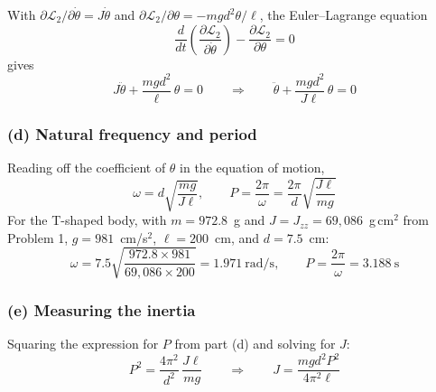 \documentclass[11pt,letterpaper]{article}
\begin{document}
With $\partial\mathcal{L}_2/\partial\dot\theta = J\dot\theta$ and $\partial\mathcal{L}_2/\partial\theta = -mgd^2\theta/\ell$, the Euler--Lagrange equation
\[
\frac{d}{dt}\left(\frac{\partial\mathcal{L}_2}{\partial\dot\theta}\right) - \frac{\partial\mathcal{L}_2}{\partial\theta} = 0
\]
gives
\[
J\ddot\theta + \frac{mgd^2}{\ell}\,\theta = 0
\qquad\Longrightarrow\qquad
\boxed{\ddot\theta + \frac{mgd^2}{J\ell}\,\theta = 0}
\]

\subsubsection*{(d) Natural frequency and period}

Reading off the coefficient of $\theta$ in the equation of motion,
\[
\boxed{\omega = d\sqrt{\frac{mg}{J\ell}}},
\qquad
\boxed{P = \frac{2\pi}{\omega} = \frac{2\pi}{d}\sqrt{\frac{J\ell}{mg}}}
\]
For the T-shaped body, with $m = 972.8$~g and $J = J_{zz} = 69{,}086$~g\,cm$^2$ from Problem 1, $g = 981$~cm/s$^2$, $\ell = 200$~cm, and $d = 7.5$~cm:
\[
\omega = 7.5\sqrt{\frac{972.8 \times 981}{69{,}086 \times 200}} = \boxed{1.971~\text{rad/s}},
\qquad
P = \frac{2\pi}{\omega} = \boxed{3.188~\text{s}}
\]

\subsubsection*{(e) Measuring the inertia}

Squaring the expression for $P$ from part (d) and solving for $J$:
\[
P^2 = \frac{4\pi^2}{d^2}\,\frac{J\ell}{mg}
\qquad\Longrightarrow\qquad
\boxed{J = \frac{mgd^2P^2}{4\pi^2\ell}}
\]
\end{document}
